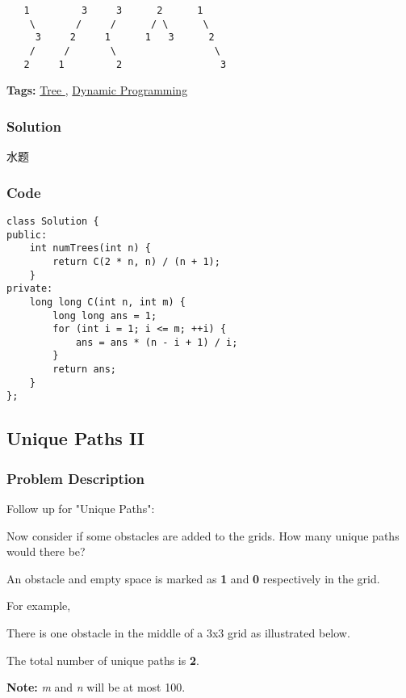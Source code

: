 \documentclass{article}
\begin{document}
\begin{CJK*}{UTF8}{gkai}
\begin{verbatim}
   1         3     3      2      1
    \       /     /      / \      \
     3     2     1      1   3      2
    /     /       \                 \
   2     1         2                 3
\end{verbatim}


\textbf{Tags: }
\hyperref[ Tree ]{ Tree },  \hyperref[ Dynamic Programming ]{ Dynamic Programming }



\subsubsection*{Solution}
水题

\subsubsection*{Code}
\begin{lstlisting}
class Solution {
public:
    int numTrees(int n) {
        return C(2 * n, n) / (n + 1);
    }
private:
    long long C(int n, int m) {
        long long ans = 1;
        for (int i = 1; i <= m; ++i) {
            ans = ans * (n - i + 1) / i;
        }
        return ans;
    }
}; 
\end{lstlisting}


\subsection{ Unique Paths II }
\label{ Unique Paths II }

\subsubsection*{Problem Description}
Follow up for "Unique Paths":

Now consider if some obstacles are added to the grids. How many unique paths would there be?

An obstacle and empty space is marked as \textbf{1} and \textbf{0} respectively in the grid.

For example,


There is one obstacle in the middle of a 3x3 grid as illustrated below.

The total number of unique paths is \textbf{2}.

\textbf{Note:} \emph{m} and \emph{n} will be at most 100.


\end{CJK*}
\end{document}
